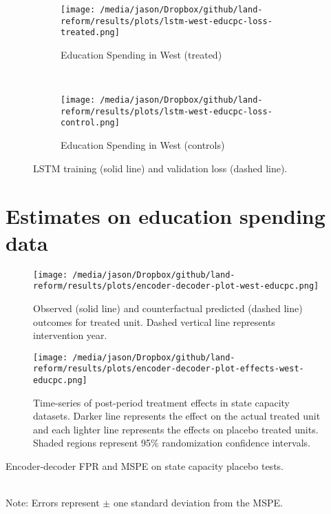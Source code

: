 \documentclass[12pt]{article}
\begin{document}
\begin{figure*}[htbp]
	\centering
	\begin{subfigure}[t]{0.45\textwidth}
		\centering
		\texttt{[image: /media/jason/Dropbox/github/land-reform/results/plots/lstm-west-educpc-loss-treated.png]}
		\caption{Education Spending in West (treated)} 
	\end{subfigure}
	~ 
	\begin{subfigure}[t]{0.45\textwidth}
		\centering
		\texttt{[image: /media/jason/Dropbox/github/land-reform/results/plots/lstm-west-educpc-loss-control.png]}
		\caption{Education Spending in West (controls)}
	\end{subfigure}
	\caption{LSTM training (solid line) and validation loss (dashed line). \label{lstm-loss-capacity-west}} 
\end{figure*}

\section{Estimates on education spending data}

\begin{figure*}[htbp]
	\centering
	\texttt{[image: /media/jason/Dropbox/github/land-reform/results/plots/encoder-decoder-plot-west-educpc.png]}
	\caption{Observed (solid line) and counterfactual predicted (dashed line) outcomes for treated unit. Dashed vertical line represents intervention year. \label{state-capacity-plot}}
\end{figure*}

\begin{figure*}[htbp]
		\centering
		\texttt{[image: /media/jason/Dropbox/github/land-reform/results/plots/encoder-decoder-plot-effects-west-educpc.png]}
		\caption{Time-series of post-period treatment effects in state capacity datasets. Darker line represents the effect on the actual treated unit and each lighter line represents the effects on placebo treated units. Shaded regions represent 95\% randomization confidence intervals. \label{state-capacity-plot-effects}}
\end{figure*}

\begin{table}[htbp]
	\begin{center}
		\caption{Encoder-decoder FPR and MSPE on state capacity placebo tests.\label{encoder-decoder-mpse}}
		\resizebox{\width}{!}{} \\
		\footnotesize{Note: Errors represent $\pm$ one standard deviation from the MSPE.}
	\end{center}
\end{table}
\end{document}
